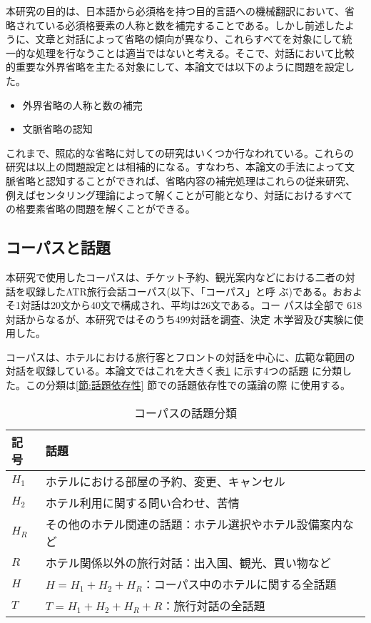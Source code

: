 本研究の目的は、日本語から必須格を持つ目的言語への機械翻訳において、省
略されている必須格要素の人称と数を補完することである。しかし前述したよ
うに、文章と対話によって省略の傾向が異なり、これらすべてを対象にして統
一的な処理を行なうことは適当ではないと考える。そこで、対話において比較
的重要な外界省略を主たる対象にして、本論文では以下のように問題を設定し
た。

\begin{itemize}
\item 外界省略の人称と数の補完
\item 文脈省略の認知
\end{itemize}

これまで、照応的な省略に対しての研究はいくつか行なわれている。これらの
研究は以上の問題設定とは相補的になる。すなわち、本論文の手法によって文
脈省略と認知することができれば、省略内容の補完処理はこれらの従来研究、
例えばセンタリング理論によって解くことが可能となり、対話におけるすべて
の格要素省略の問題を解くことができる。




\subsection{コーパスと話題}
\label{節:コーパス}

本研究で使用したコーパスは、チケット予約、観光案内などにおける二者の対
話を収録したATR旅行会話コーパス\cite{ATRCorpus}(以下、「コーパス」と呼
ぶ)である。おおよそ1対話は20文から40文で構成され、平均は26文である。コー
パスは全部で 618 対話からなるが、本研究ではそのうち499対話を調査、決定
木学習及び実験に使用した。

コーパスは、ホテルにおける旅行客とフロントの対話を中心に、広範な範囲の
対話を収録している。本論文ではこれを大きく表\ref{話題} に示す4つの話題
に分類した。この分類は\ref{節:話題依存性} 節での話題依存性での議論の際
に使用する。


\begin{table}
\begin{center}
\caption{コーパスの話題分類}
\label{話題}
\begin{tabular}{ll}
\hline\hline
記号  & 話題 \\
\hline
$H_1$ & ホテルにおける部屋の予約、変更、キャンセル\\
$H_2$ & ホテル利用に関する問い合わせ、苦情\\
$H_R$ & その他のホテル関連の話題：ホテル選択やホテル設備案内など\\
$R$   & ホテル関係以外の旅行対話：出入国、観光、買い物など\\
\hline
$H$   & $H=H_1+H_2+H_R$：コーパス中のホテルに関する全話題\\
$T$   & $T=H_1+H_2+H_R+R$：旅行対話の全話題\\
\hline
\end{tabular}
\end{center}
\end{table}


